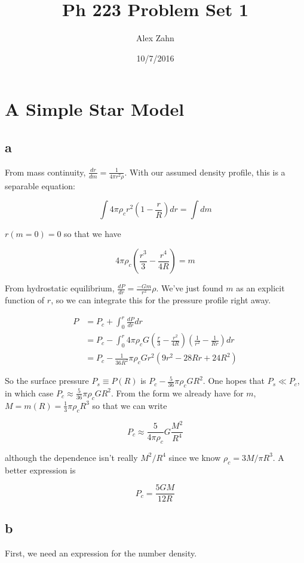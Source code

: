 \documentclass[12pt]{article}
\title{Ph 223 Problem Set 1}
\author{Alex Zahn}
\date{10/7/2016}
\begin{document}
\maketitle

\newcommand{\wmsq}{W/\(\mathrm{m}^2\,\)}
\newcommand{\msq}{\(\mathrm{m}^2\,\)}
\newcommand{\micron}{\(\mu\mathrm{m}\)\,}
\newcommand{\mcb}{\(\mathrm{m}^3\,\)}

\section{A Simple Star Model}

\subsection*{a}

From mass continuity, \(\frac{dr}{dm} = \frac{1}{4\pi r^2 \rho}\). With our assumed density profile, this is a separable equation:

\[ \int 4\pi \rho_c r^2\left(1-\frac{r}{R}\right)dr = \int dm
\]

\(r(m=0) = 0\) so that we have

\[ 4\pi \rho_c \left( \frac{r^3}{3} - \frac{r^4}{4R} \right) = m
\]

From hydrostatic equilibrium, \(\frac{dP}{dr} = \frac{-Gm}{r^2}\rho\). We've just found \(m\) as an explicit function of \(r\), so we can integrate this for the pressure profile right away.

\begin{align*}
P &= P_c + \int_0^r \frac{dP}{dr}dr \\[12pt]
&= P_c - \int_0^r 4\pi\rho_c G \left(  \frac{r}{3} - \frac{r^2}{4R} \right)\left( \frac{1}{r^2} - \frac{1}{Rr} \right)dr \\[12pt]
&= P_c - \frac{1}{36R^2} \pi\rho_c G r^2\left( 9r^2 -28Rr + 24R^2 \right)
\end{align*}

So the surface pressure \( P_s \equiv P(R)\) is \(P_c - \frac{5}{36}\pi\rho_c G R^2\). One hopes that \(P_s \ll P_c\), in which case \(P_c \approx \frac{5}{36}\pi\rho_cG R^2\). From the form we already have for \(m\), \(M = m(R) = \frac{1}{3}\pi\rho_c R^3 \) so that we can write

\[ P_c \approx \frac{5}{4\pi\rho_c}G\frac{M^2}{R^4}
\]

although the dependence isn't really \(M^2/R^4\) since we know \(\rho_c = 3M/\pi R^3\). A better expression is

\[ P_c = \frac{5GM}{12R}\]

\subsection*{b}

First, we need an expression for the number density.
\end{document}
